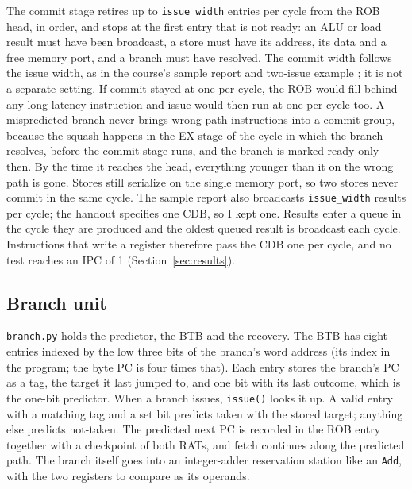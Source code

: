 \documentclass[11pt]{article}
\newcommand{\code}[1]{\texttt{#1}}
\begin{document}
The commit stage retires up to \code{issue\_width} entries per cycle from the ROB head, in
order, and stops at the first entry that is not ready: an ALU or load result must have been
broadcast, a store must have its address, its data and a free memory port, and a branch must
have resolved. The commit width follows the issue width, as in the course's sample report
and two-issue example \cite{sample,oooexample}; it is not a separate setting. If commit stayed at one per cycle, the ROB
would fill behind any long-latency instruction and issue would then run at one per cycle
too. A mispredicted branch never brings wrong-path instructions into a commit
group, because the squash happens in the EX stage of the cycle in which the branch resolves,
before the commit stage runs, and the branch is marked ready only then. By the time it
reaches the head, everything younger than it on the wrong path is gone. Stores still
serialize on the single memory port, so two stores never commit in the same cycle. The
sample report also broadcasts \code{issue\_width} results per cycle; the handout specifies
one CDB, so I kept one. Results enter a queue in the cycle they are produced and the oldest
queued result is broadcast each cycle. Instructions that write a register therefore pass the
CDB one per cycle, and no test reaches an IPC of 1 (Section~\ref{sec:results}).

\subsection{Branch unit}
\label{sec:branch}

\code{branch.py} holds the predictor, the BTB and the recovery. The BTB has eight entries
indexed by the low three bits of the branch's word address (its index in the program;
the byte PC is four times that). Each entry stores the branch's PC as a tag, the target it
last jumped to, and one bit with its last outcome, which is the one-bit predictor. When a
branch issues, \code{issue()} looks it up. A valid entry with a matching tag and a set bit
predicts taken with the stored target; anything else predicts not-taken. The predicted next
PC is recorded in the ROB entry together with a checkpoint of both RATs, and fetch continues
along the predicted path. The branch itself goes into an integer-adder reservation station
like an \code{Add}, with the two registers to compare as its operands.
\end{document}
